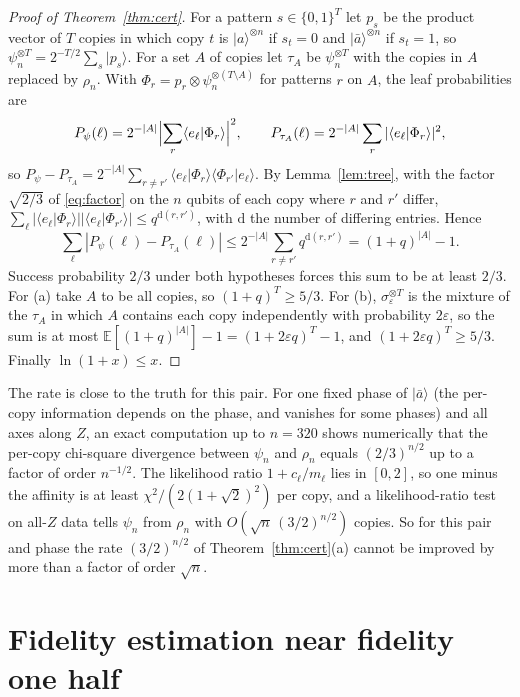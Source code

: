 \documentclass[11pt]{article}
\theoremstyle{remark}
\newcommand{\eps}{\varepsilon}
\newcommand{\ket}[1]{|#1\rangle}
\newcommand{\abar}{\bar a}
\newcommand{\E}{\mathbb{E}}
\begin{document}
\begin{proof}[Proof of Theorem~\ref{thm:cert}]
For a pattern $s\in\{0,1\}^T$ let $p_s$ be the product vector of $T$ copies in which copy $t$ is $\ket a^{\otimes n}$ if $s_t = 0$ and $\ket\abar^{\otimes n}$ if $s_t = 1$, so $\psi_n^{\otimes T} = 2^{-T/2}\sum_s\ket{p_s}$. For a set $A$ of copies let $\tau_A$ be $\psi_n^{\otimes T}$ with the copies in $A$ replaced by $\rho_n$. With $\Phi_r = p_r\otimes\psi_n^{\otimes(T\setminus A)}$ for patterns $r$ on $A$, the leaf probabilities are
\[
P_\psi(\ell) = 2^{-|A|}\Bigl|\sum_r\langle e_\ell|\Phi_r\rangle\Bigr|^2,\qquad P_{\tau_A}(\ell) = 2^{-|A|}\sum_r|\langle e_\ell|\Phi_r\rangle|^2,
\]
so $P_\psi-P_{\tau_A} = 2^{-|A|}\sum_{r\ne r'}\langle e_\ell|\Phi_r\rangle\langle\Phi_{r'}|e_\ell\rangle$. By Lemma~\ref{lem:tree}, with the factor $\sqrt{2/3}$ of \eqref{eq:factor} on the $n$ qubits of each copy where $r$ and $r'$ differ, $\sum_\ell|\langle e_\ell|\Phi_r\rangle||\langle e_\ell|\Phi_{r'}\rangle|\le q^{\mathrm{d}(r,r')}$, with $\mathrm{d}$ the number of differing entries. Hence
\[
\sum_\ell|P_\psi(\ell)-P_{\tau_A}(\ell)|\le2^{-|A|}\sum_{r\ne r'}q^{\mathrm d(r,r')} = (1+q)^{|A|}-1.
\]
Success probability $2/3$ under both hypotheses forces this sum to be at least $2/3$. For (a) take $A$ to be all copies, so $(1+q)^T\ge5/3$. For (b), $\sigma_\eps^{\otimes T}$ is the mixture of the $\tau_A$ in which $A$ contains each copy independently with probability $2\eps$, so the sum is at most $\E[(1+q)^{|A|}]-1 = (1+2\eps q)^T-1$, and $(1+2\eps q)^T\ge5/3$. Finally $\ln(1+x)\le x$.
\end{proof}

The rate is close to the truth for this pair. For one fixed phase of $\ket\abar$ (the per-copy information depends on the phase, and vanishes for some phases) and all axes along $Z$, an exact computation up to $n = 320$ shows numerically that the per-copy chi-square divergence between $\psi_n$ and $\rho_n$ equals $(2/3)^{n/2}$ up to a factor of order $n^{-1/2}$. The likelihood ratio $1+c_\ell/m_\ell$ lies in $[0,2]$, so one minus the affinity is at least $\chi^2/(2(1+\sqrt2)^2)$ per copy, and a likelihood-ratio test on all-$Z$ data tells $\psi_n$ from $\rho_n$ with $O(\sqrt n\,(3/2)^{n/2})$ copies. So for this pair and phase the rate $(3/2)^{n/2}$ of Theorem~\ref{thm:cert}(a) cannot be improved by more than a factor of order $\sqrt n$.

\section{Fidelity estimation near fidelity one half}\label{sec:half}
\end{document}
